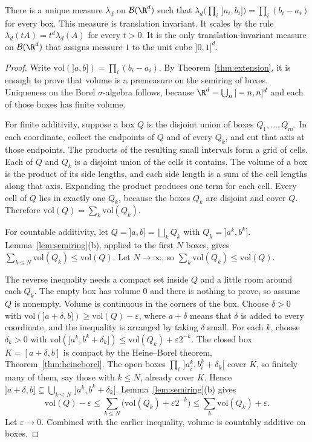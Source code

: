 \begin{theorem}\label{thm:lebesgue}
There is a unique measure $\lambda_d$ on $\mathcal B(\R^d)$ such that $\lambda_d\bigl(\prod_i\,]a_i,b_i]\bigr)=\prod_i(b_i-a_i)$ for every box.
This measure is translation invariant.
It scales by the rule $\lambda_d(tA)=t^d\lambda_d(A)$ for every $t>0$.
It is the only translation-invariant measure on $\mathcal B(\R^d)$ that assigns measure $1$ to the unit cube $]0,1]^d$.
\end{theorem}
\begin{proof}
Write $\mathrm{vol}(]a,b])=\prod_i(b_i-a_i)$.
By Theorem~\ref{thm:extension}, it is enough to prove that volume is a premeasure on the semiring of boxes.
Uniqueness on the Borel $\sigma$-algebra follows, because $\R^d=\bigcup_n\,]-n,n]^d$ and each of those boxes has finite volume.

For finite additivity, suppose a box $Q$ is the disjoint union of boxes $Q_1,\ldots,Q_m$.
In each coordinate, collect the endpoints of $Q$ and of every $Q_k$, and cut that axis at those endpoints.
The products of the resulting small intervals form a grid of cells.
Each of $Q$ and $Q_k$ is a disjoint union of the cells it contains.
The volume of a box is the product of its side lengths, and each side length is a sum of the cell lengths along that axis.
Expanding the product produces one term for each cell.
Every cell of $Q$ lies in exactly one $Q_k$, because the boxes $Q_k$ are disjoint and cover $Q$.
Therefore $\mathrm{vol}(Q)=\sum_k\mathrm{vol}(Q_k)$.

For countable additivity, let $Q=]a,b]=\bigsqcup_k Q_k$ with $Q_k=]a^k,b^k]$.
Lemma~\ref{lem:semiring}(b), applied to the first $N$ boxes, gives $\sum_{k\le N}\mathrm{vol}(Q_k)\le\mathrm{vol}(Q)$.
Let $N\to\infty$, so $\sum_k\mathrm{vol}(Q_k)\le\mathrm{vol}(Q)$.

The reverse inequality needs a compact set inside $Q$ and a little room around each $Q_k$.
The empty box has volume $0$ and there is nothing to prove, so assume $Q$ is nonempty.
Volume is continuous in the corners of the box.
Choose $\delta>0$ with $\mathrm{vol}(]a+\delta,b])\ge\mathrm{vol}(Q)-\varepsilon$, where $a+\delta$ means that $\delta$ is added to every coordinate, and the inequality is arranged by taking $\delta$ small.
For each $k$, choose $\delta_k>0$ with $\mathrm{vol}(]a^k,b^k+\delta_k])\le\mathrm{vol}(Q_k)+\varepsilon 2^{-k}$.
The closed box $K=[a+\delta,b]$ is compact by the Heine--Borel theorem, Theorem~\ref{thm:heineborel}.
The open boxes $\prod_i\,]a^k_i,b^k_i+\delta_k[$ cover $K$, so finitely many of them, say those with $k\le N$, already cover $K$.
Hence $]a+\delta,b]\subseteq\bigcup_{k\le N}\,]a^k,b^k+\delta_k]$.
Lemma~\ref{lem:semiring}(b) gives
\[\mathrm{vol}(Q)-\varepsilon\le\sum_{k\le N}\bigl(\mathrm{vol}(Q_k)+\varepsilon2^{-k}\bigr)\le\sum_k\mathrm{vol}(Q_k)+\varepsilon.\]
Let $\varepsilon\to0$.
Combined with the earlier inequality, volume is countably additive on boxes.


\end{proof}
